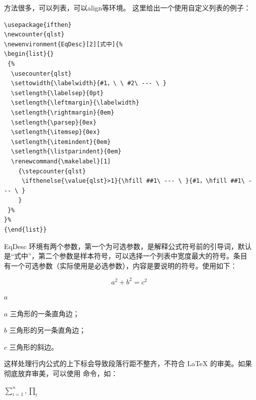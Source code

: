
方法很多，可以列表，可以align等环境。 这里给出一个使用自定义列表的例子：

\begin{verbatim}
\usepackage{ifthen}
\newcounter{qlst}
\newenvironment{EqDesc}[2][式中]{%
\begin{list}{}
 {%
  \usecounter{qlst}
  \settowidth{\labelwidth}{#1，\ \ #2\ --- \ }
  \setlength{\labelsep}{0pt}
  \setlength{\leftmargin}{\labelwidth}
  \setlength{\rightmargin}{0em}
  \setlength{\parsep}{0ex}
  \setlength{\itemsep}{0ex}
  \setlength{\itemindent}{0em}
  \setlength{\listparindent}{0em}
  \renewcommand{\makelabel}[1]
    {\stepcounter{qlst}
     \ifthenelse{\value{qlst}>1}{\hfill ##1\ --- \ }{#1，\hfill ##1\ --- \ }
    }
 }%
}%
{\end{list}}
\end{verbatim}

EqDesc
环境有两个参数，第一个为可选参数，是解释公式符号前的引导词，默认是``式中''，第二个参数是样本符号，可以选择一个列表中宽度最大的符号。条目  有一个可选参数（实际使用是必选参数），内容是要说明的符号。使用如下：

\begin{example}
\[ a^2+b^2=c^2 \]
\begin{EqDesc}[其中]{$a$}
   \item[$a$] 三角形的一条直角边；
   \item[$b$] 三角形的另一条直角边；
   \item[$c$] 三角形的斜边。
\end{EqDesc}
\end{example}




这样处理行内公式的上下标会导致段落行距不整齐，不符合 \LaTeX{}
的审美。如果彻底放弃审美，可以使用  命令，如：

\begin{example}
$\sum\limits_{i=1}^n, \prod\limits_\epsilon$
\end{example}

